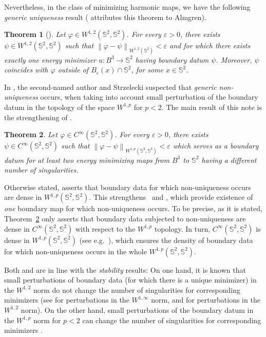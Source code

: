 \documentclass[12pt]{amsart}
\def\eps{\varepsilon}
\def\S{{\mathbb S}}
\newtheorem{theorem}{Theorem}
\newcommand{\norm}[1]{\left\|{#1}\right\|}
\numberwithin{theorem}{section} \numberwithin{equation}{section}
\begin{document}
Nevertheless, in the class of minimizing harmonic maps, we have the following \emph{generic uniqueness} result (\cite{AL88} attributes this theorem to Almgren).
\begin{theorem}[{\cite[Theorem 4.1]{AL88}}]\label{th:ALuniqueness}
 Let $\varphi \in W^{1,2}(\S^2,\S^2)$. For every $\eps>0$, there exists $\psi\in W^{1,2}(\S^2,\S^2)$ such that $\norm{\varphi - \psi}_{W^{1,2}(\S^2)} < \eps$ and for which there exists exactly one energy minimizer $u\colon B^3 \to \S^2$ having boundary datum $\psi$. Moreover, $\psi$ coincides with $\varphi$ outside of $B_\eps(x)\cap \S^2$, for some $x\in \S^2$.
\end{theorem}
In \cite{MazowieckaStrzelecki}, the second-named author and Strzelecki suspected that \emph{generic non-uniqueness} occurs, when taking into account small perturbation of the boundary datum in the topology of the space $W^{1,p}$ for $p<2$. The main result of this note is the strengthening of \cite[Remark 4.1]{MazowieckaStrzelecki}.
\begin{theorem}\label{th:main}
Let $\varphi \in C^\infty(\S^2,\S^2)$. For every $\eps>0$, there exists $\psi\in C^\infty(\S^2,\S^2)$ such that $\norm{\varphi-\psi}_{W^{1,p}(\S^2,\S^2)}<\eps$ which serves as a boundary datum for at least two energy minimizing maps from $B^3$ to $\S^2$ having a different number of singularities.
\end{theorem}

Otherwise stated,  asserts that boundary data for which non-uniqueness occurs are dense in \( W^{1,p}(\S^{2},\S^{2}) \).
This strengthens~\cite[Section 5]{HardtLin89} and \cite[Remark~4.1]{MazowieckaStrzelecki}, which provide existence of \emph{one} boundary map for which non-uniqueness occurs.
To be precise, as it is stated, Theorem~\ref{th:main} only asserts that boundary data subjected to non-uniqueness are dense in \( C^{\infty}(\S^{2},\S^{2}) \) with respect to the \( W^{1,p} \) topology.
In turn, \( C^{\infty}(\S^{2},\S^{2}) \) is dense in \( W^{1,p}(\S^{2},\S^{2}) \) (see e.g.~\cite[Theorem~1]{BethuelZheng1988}), which ensures the density of boundary data for which non-uniqueness occurs in the whole \( W^{1,p}(\S^{2},\S^{2}) \).


Both  and  are in line with the \emph{stability} results: 
On one hand, it is known that small perturbations of boundary data (for which there is a unique minimizer) in the $W^{1,2}$ norm do not change the number of singularities for corresponding minimizers (see \cite{HardtLin89} for perturbations in the $W^{1,\infty}$ norm, \cite{MMS} and \cite{SiranLi} for perturbations in the $W^{1,2}$ norm). 
On the other hand, small perturbations of the boundary datum in the $W^{1,p}$ norm for $p<2$ can change the number of singularities for corresponding minimizers \cite{MazowieckaStrzelecki}.
\end{document}
